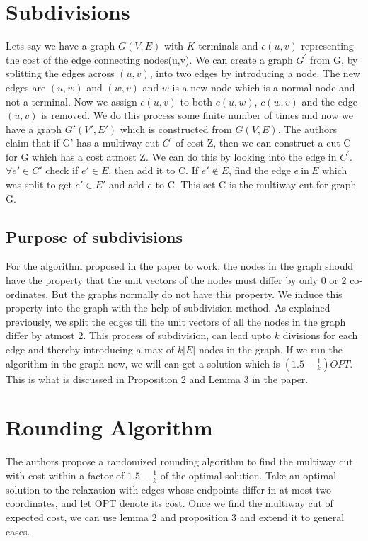 \documentclass[11pt]{article}
\begin{document}
\section{Subdivisions}
Lets say we have a graph $G(V,E)$ with $K$ terminals and $c(u,v)$ representing the cost of the edge connecting nodes(u,v). We can create a graph $G^{'}$ from G, by splitting the edges across $(u,v)$, into two edges by introducing a node. The new edges are $(u,w)$ and $(w,v)$ and $w$ is a new node which is a normal node and not a terminal. Now we assign $c(u,v)$ to both $c(u,w)$, $c(w,v)$ and the edge $(u,v)$ is removed. We do this process some finite number of times and now we have a graph $G'(V',E')$  which is constructed from $G(V,E)$. The authors claim that if G' has a multiway cut $C^{'}$ of cost Z, then we can construct a cut C for G which has a cost atmost Z. We can do this by looking into the edge in $C^{'}$. $\forall e' \in C'$ check if $e' \in E$, then add it to C. If $e' \notin E$, find the edge $e \ \text{in} \ E$ which was split to get $e' \in E'$ and add $e$ to C. This set C is the multiway cut for graph G.

\subsection{Purpose of subdivisions}
For the algorithm proposed in the paper to work, the nodes in the graph should have the property that the unit vectors of the nodes must differ by only 0 or 2 co-ordinates. But the graphs normally do not have this property. We induce this property into the graph with the help of subdivision method. As explained previously, we split the edges till the unit vectors of all the nodes in the graph differ by atmost 2. This process of subdivision, can lead upto $k$ divisions for each edge and thereby introducing a max of $k\vert E \vert$ nodes in the graph. If we run the algorithm in the graph now, we will can get a solution which is $(1.5 - \frac{1}{k})OPT$. This is what is discussed in Proposition 2 and Lemma 3 in the paper. 

\section{Rounding Algorithm}
The authors propose a randomized rounding algorithm to find the multiway cut with cost within a factor of $1.5 - \frac{1}{k}$ of the optimal solution. Take an optimal solution to the relaxation with edges whose endpoints differ in at most two coordinates, and let OPT denote its cost. Once we find the multiway cut of expected cost, we can use lemma 2 and proposition 3 and extend it to general cases.
  
\end{document}
